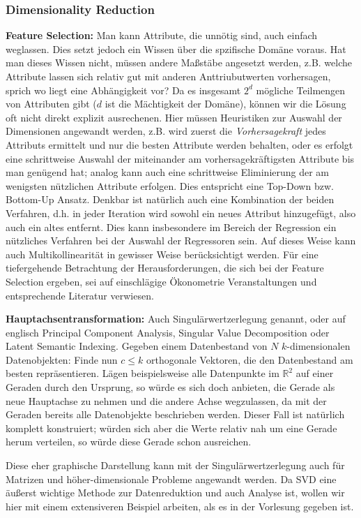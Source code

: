 \subsubsection{Dimensionality Reduction}
\textbf{Feature Selection:} Man kann Attribute, die unnötig sind, auch einfach
weglassen. Dies setzt jedoch ein Wissen über die spzifische Domäne voraus. Hat
man dieses Wissen nicht, müssen andere Maßstäbe angesetzt werden, z.B. welche 
Attribute lassen sich relativ gut mit anderen Anttriubutwerten vorhersagen,
sprich wo liegt eine Abhängigkeit vor? Da es insgesamt \(2^d\) mögliche
Teilmengen von Attributen gibt (\(d\) ist die Mächtigkeit der Domäne), 
können wir die Lösung oft nicht direkt explizit ausrechenen. Hier
müssen Heuristiken zur Auswahl der Dimensionen angewandt werden, z.B. wird zuerst die
\textit{Vorhersagekraft} jedes Attributs ermittelt und nur die besten Attribute
werden behalten, oder es erfolgt eine schrittweise Auswahl der miteinander am vorhersagekräftigsten
Attribute bis man genügend hat; analog kann auch eine schrittweise Eliminierung der am
wenigsten nützlichen Attribute erfolgen. Dies entspricht eine Top-Down bzw.
Bottom-Up Ansatz. Denkbar ist natürlich auch eine Kombination der beiden
Verfahren, d.h. in jeder Iteration wird sowohl ein neues Attribut hinzugefügt,
also auch ein altes entfernt. Dies kann insbesondere im Bereich der Regression
ein nützliches Verfahren bei der Auswahl der Regressoren sein. Auf dieses Weise
kann auch Multikollinearität in gewisser Weise berücksichtigt werden. Für eine
tiefergehende Betrachtung der Herausforderungen, die sich bei der Feature
Selection ergeben, sei auf einschlägige Ökonometrie Veranstaltungen und
entsprechende Literatur verwiesen.

\textbf{Hauptachsentransformation:} Auch Singulärwertzerlegung genannt, oder auf 
englisch Principal Component Analysis, Singular Value Decomposition oder Latent 
Semantic Indexing. Gegeben einem Datenbestand von \(N\) \(k\)-dimensionalen 
Datenobjekten: Finde nun \(c\leq k\) orthogonale Vektoren, die den Datenbestand
am besten repräsentieren. Lägen beispielsweise alle Datenpunkte im \(\mathbb{R}^2\)
auf einer Geraden durch den Ursprung, so würde es sich doch anbieten, die Gerade
als neue Hauptachse zu nehmen und die andere Achse wegzulassen, da mit der Geraden
bereits alle Datenobjekte beschrieben werden. Dieser Fall ist natürlich komplett
konstruiert; würden sich aber die Werte relativ nah um eine Gerade herum verteilen,
so würde diese Gerade schon ausreichen.

Diese eher graphische Darstellung kann mit der Singulärwertzerlegung auch für
Matrizen und höher-dimensionale Probleme angewandt werden. Da SVD eine äußerst
wichtige Methode zur Datenreduktion und auch Analyse ist, wollen wir hier mit 
einem extensiveren Beispiel arbeiten, als es in der Vorlesung gegeben ist.

